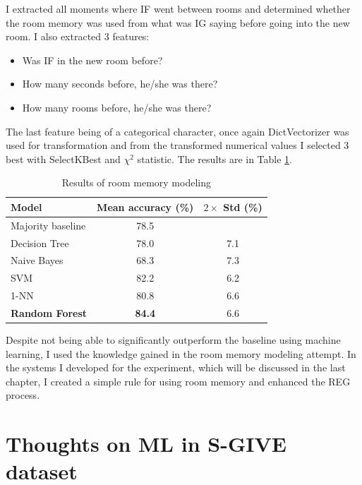 I extracted all moments where IF went between rooms and determined whether the room memory was used from what was IG saying before going into the new room. I also extracted 3 features:

\begin{itemize}
\item
Was IF in the new room before?
\item
How many seconds before, he/she was there?
\item
How many rooms before, he/she was there?
\end{itemize}

The last feature being of a categorical character, once again DictVectorizer was used for transformation and from the transformed numerical values I selected 3 best with SelectKBest and $\chi^2$ statistic. The results are in Table \ref{tab:history-ml}.

\begin{table}[!htbp]
 \centering
\begin{tabular}{lcc}
\toprule
Model    & Mean accuracy (\%) & $2\times$ Std (\%) \\
\midrule
 Majority baseline    & 78.5	& \\
\midrule
 Decision Tree 	& 78.0	& 7.1 	\\
 Naive Bayes  	& 68.3	& 7.3	\\
 SVM 			& 82.2	& 6.2 	\\
 1-NN			& 80.8	& 6.6 	\\
 \textbf{Random Forest}	& \textbf{84.4}	& 6.6	\\
\bottomrule
\end{tabular}
\caption{Results of room memory modeling}
\label{tab:history-ml}
\end{table}

Despite not being able to significantly outperform the baseline using machine learning, I used the knowledge gained in the room memory modeling attempt. In the systems I developed for the experiment, which will be discussed in the last chapter, I created a simple rule for using room memory and enhanced the REG process.

\section{Thoughts on ML in S-GIVE dataset}


